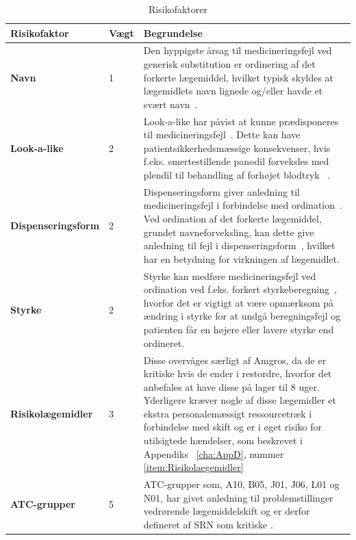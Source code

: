 \begin{longtable}{p{3.5cm}| p{1cm} | p{9.5cm}}
	\caption{Risikofaktorer}
	\label{table:features} \\
\cellcolor[HTML]{C0C0C0} {\textbf{Risikofaktor}} & \cellcolor[HTML]{C0C0C0} {\textbf{Vægt}}& \cellcolor[HTML]{C0C0C0} {\textbf{Begrundelse}}  \\ \hline
\textbf{Navn} & 1 & Den hyppigste årsag til medicineringsfejl ved generisk substitution er ordinering af det forkerte lægemiddel, hvilket typisk skyldes at lægemidlets navn lignede og/eller havde et svært navn~\citep{Hakonsen2010}. \\  \hline 
\textbf{Look-a-like} & 2 & Look-a-like har påvist at kunne prædisponeres til medicineringsfejl~\citep{Wittich2014}. Dette kan have patientsikkerhedsmæssige konsekvenser, hvis f.eks. smertestillende panodil forveksles med plendil til behandling af forhøjet blodtryk ~\citep{DanskSelskabforPatientsikkerhed2009}.\\  \hline 
\textbf{Dispenseringsform} & 2 & Dispenseringsform giver anledning til medicineringsfejl i forbindelse med ordination~\citep{Agrawal2009}. Ved ordination af det forkerte lægemiddel, grundet navneforveksling, kan dette give anledning til fejl i dispenseringsform~\citep{DanskSelskabforPatientsikkerhed2009}, hvilket har en betydning for virkningen af lægemidlet.
\\ \hline 
\textbf{Styrke} & 2 & Styrke kan medføre medicineringsfejl ved ordination ved f.eks. forkert styrkeberegning~\citep{Agrawal2009}, hvorfor det er vigtigt at være opmærksom på  ændring i styrke for at undgå beregningsfejl og patienten får en højere eller lavere styrke end ordineret.\\ \hline
\textbf{Risikolægemidler} & 3 & Disse overvåges særligt af Amgros, da de er kritiske hvis de ender i restordre, hvorfor det anbefales at have disse på lager til 8 uger. Yderligere kræver nogle af disse lægemidler et ekstra personalemæssigt ressourcetræk i forbindelse med skift og er i øget risiko for utilsigtede hændelser, som beskrevet i Appendiks ~\ref{cha:AppD}, nummer \ref{item:Risikolaegemidler}  \\ \hline 
\textbf{ATC-grupper} & 5 & ATC-grupper som, A10, B05, J01, J06, L01 og N01, har givet anledning til problemstillinger vedrørende lægemiddelskift og er derfor defineret af SRN som kritiske \citep{SRN}.

\end{longtable}
